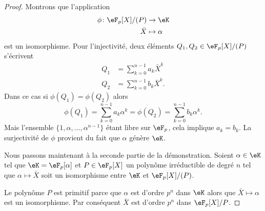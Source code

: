 \begin{proof}
	Montrons que l'application
	\begin{equation}
		\begin{aligned}
			\phi\colon \eF_p[X]/(P) & \to \eK        \\
			\bar X                  & \mapsto \alpha
		\end{aligned}
	\end{equation}
	est un isomorphisme. Pour l'injectivité, deux éléments \( Q_1,Q_2\in \eF_p[X]/(P)\) s'écrivent
	\begin{subequations}
		\begin{align}
			Q_1 & =\sum_{k=0}^{n-1}a_k\bar X^k  \\
			Q_2 & =\sum_{k=0}^{n-1}b_k\bar X^k.
		\end{align}
	\end{subequations}
	Dans ce cas si \( \phi(Q_1)=\phi(Q_2)\) alors
	\begin{equation}
		\phi(Q_1)=\sum_{k=0}^{n-1}a_k\alpha^k=\phi(Q_2)=\sum_{k=0}^{n-1}b_k\alpha^k.
	\end{equation}
	Mais l'ensemble \( \{ 1,\alpha,\ldots, \alpha^{n-1} \}\) étant libre sur \( \eF_p\), cela implique \( a_k=b_k\). La surjectivité de \( \phi\) provient du fait que \( \alpha\) génère \( \eK\).

	Nous passons maintenant à la seconde partie de la démonstration. Soient \( \alpha\in \eK\) tel que \( \eK=\eF_p[\alpha]\) et \( P\in \eF_p[X]\) un polynôme irréductible de degré \( n\) tel que \( \alpha\mapsto \bar X\) soit un isomorphisme entre \( \eK\) et \( \eF_p[X]/(P)\).

	Le polynôme \( P\) est primitif parce que \( \alpha\) est d'ordre \( p^n\) dans \( \eK\) alors que \( \bar X\mapsto \alpha\) est un isomorphisme. Par conséquent \( \bar X\) est d'ordre \( p^n\) dans \( \eF_p[X]/P\).


\end{proof}
